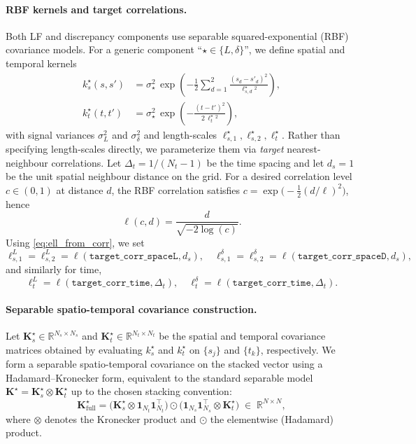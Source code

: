\documentclass[12pt]{article}
\begin{document}
\paragraph{RBF kernels and target correlations.}
Both LF and discrepancy components use separable squared-exponential (RBF) covariance models.
For a generic component ``$\star\in\{L,\delta\}$'', we define spatial and temporal kernels
\begin{align}
k^{\star}_s(s,s') &= \sigma^2_{\star}\,
\exp\!\left(-\frac{1}{2}\sum_{d=1}^{2}\frac{(s_d-s'_d)^2}{\ell^{\star}_{s,d}{}^{2}}\right), \\
k^{\star}_t(t,t') &= \sigma^2_{\star}\,
\exp\!\left(-\frac{(t-t')^2}{2\,\ell^{\star}_t{}^{2}}\right),
\end{align}
with signal variances $\sigma^2_L$ and $\sigma^2_\delta$ and length-scales
$\ell^{\star}_{s,1},\ell^{\star}_{s,2},\ell^{\star}_t$.
Rather than specifying length-scales directly, we parameterize them via \emph{target}
nearest-neighbour correlations. Let $\Delta_t=1/(N_t-1)$ be the time spacing and let $d_s=1$ be the
unit spatial neighbour distance on the grid. For a desired correlation level $c\in(0,1)$ at distance $d$,
the RBF correlation satisfies $c=\exp\!\big(-\tfrac{1}{2}(d/\ell)^2\big)$, hence
\begin{equation}\label{eq:ell_from_corr}
\ell(c,d)= \frac{d}{\sqrt{-2\log(c)}}.
\end{equation}
Using \eqref{eq:ell_from_corr}, we set
\[
\ell^{L}_{s,1}=\ell^{L}_{s,2}=\ell(\texttt{target\_corr\_spaceL},d_s),\quad
\ell^{\delta}_{s,1}=\ell^{\delta}_{s,2}=\ell(\texttt{target\_corr\_spaceD},d_s),
\]
and similarly for time,
\[
\ell^{L}_{t}=\ell(\texttt{target\_corr\_time},\Delta_t),\quad
\ell^{\delta}_{t}=\ell(\texttt{target\_corr\_time},\Delta_t).
\]

\paragraph{Separable spatio-temporal covariance construction.}
Let $\bm{K}^{\star}_s\in\mathbb{R}^{N_s\times N_s}$ and
$\bm{K}^{\star}_t\in\mathbb{R}^{N_t\times N_t}$ be the spatial and temporal covariance matrices obtained
by evaluating $k_s^\star$ and $k_t^\star$ on $\{s_j\}$ and $\{t_k\}$, respectively.
We form a separable spatio-temporal covariance on the stacked vector using a Hadamard--Kronecker form,
equivalent to the standard separable model $\bm{K}^\star=\bm{K}^\star_s\otimes \bm{K}^\star_t$ up to
the chosen stacking convention:
\begin{equation}
\bm{K}^\star_{\text{full}}
=
\big(\bm{K}^\star_s \otimes \bm{1}_{N_t}\bm{1}_{N_t}^\top\big)
\odot
\big(\bm{1}_{N_s}\bm{1}_{N_s}^\top \otimes \bm{K}^\star_t\big)
\;\in\;\mathbb{R}^{N\times N},
\end{equation}
where $\otimes$ denotes the Kronecker product and $\odot$ the elementwise (Hadamard) product.
\end{document}
